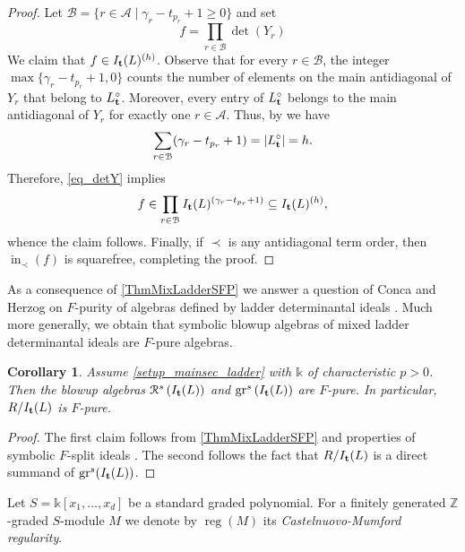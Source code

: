 \documentclass[12pt]{amsart}
\renewcommand{\geq}{\geqslant}
\newtheorem{corollary}[corollary]{Corollary}
\theoremstyle{definition}
\newcommand{\R}[1]{R^{1/p^{#1}}}
\renewcommand{\(}{\left(}
\renewcommand{\)}{\right)}
\newcommand{\ZZ}{\mathbb{Z}}
\newcommand{\kk}{\mathbb{k}}
\newcommand{\IN}{\operatorname{in}}
\newcommand{\reg}{\operatorname{reg}}
\newcommand{\gr}{\operatorname{gr}}
\def \R{\mathcal R}
\renewcommand{\!}[1]{{\color{red}\text{\Huge$\star$ }#1}}
\newcommand{\ttt}{{\bf t}}
\begin{document}
\begin{proof}
Let $\mathcal{B}=\{r \in \mathcal{A}\mid \gamma_r-t_{p_r}+1 \geq 0\}$ and set 
\begin{equation}\label{eq_f}
f=\prod_{r \in \mathcal{B}} \det(Y_r)
\end{equation}
 We claim that $f \in I_{\ttt}(L)^{(h)}$. Observe that for every $r \in \mathcal{B}$, the integer $\max\{\gamma_r-t_{p_r}+1,0\}$ counts  the number of elements on the main antidiagonal of $Y_r$ that belong to $L^\circ_\ttt$. 
Moreover, %
every entry of $L^\circ_\ttt$  belongs to the main antidiagonal of  $Y_r$ for exactly one $r \in \mathcal{A}$. Thus, by  \cite[Theorem 1.15]{GorlaMixed} we  have 
\begin{equation}\label{eq_sum_height}
	\sum_{r \in \mathcal{B}}(\gamma_r-t_{p_r} + 1) = |L^\circ_\ttt| = h.
\end{equation}
 Therefore, \autoref{eq_detY} implies
\[
f \in \prod_{r \in \mathcal{B}} I_{\ttt}(L)^{\left(\gamma_r-t_{p_r}+1\right)} \subseteq I_{\ttt}(L)^{(h)},
\]
whence the claim follows. Finally, if $\prec$ is any antidiagonal term order, then $\IN_\prec(f)$ is squarefree, completing the proof.
\end{proof}

As a consequence of \autoref{ThmMixLadderSFP} we answer a question of Conca and Herzog on $F$-purity of algebras defined by ladder determinantal ideals \cite[p. 122]{concaherzog1997}. Much more generally, we obtain that symbolic blowup algebras of mixed ladder determinantal ideals are $F$-pure algebras. 

\begin{corollary}\label{blowups_f_pure}
Assume \autoref{setup_mainsec_ladder} with   $\mathbb{k}$ of  characteristic $p>0$.
Then the blowup algebras $\R^s\left(I_{\ttt}(L)\right)$ and $\gr^s\left(I_{\ttt}(L)\right)$ are $F$-pure. In particular, $R/I_\ttt(L)$ is $F$-pure.
\end{corollary}
\begin{proof}
The first claim follows from  \autoref{ThmMixLadderSFP} and properties of symbolic $F$-split ideals \cite[Theorem 4.7]{DSMNB}. The second follows the fact that $R/I_\ttt(L)$ is a direct summand of $\gr^s(I_\ttt(L))$.
\end{proof}

Let $S=\kk[x_1,\ldots, x_d]$ be a standard graded polynomial. For a finitely generated $\ZZ$-graded $S$-module $M$ we  denote by $\reg(M)$ its   {\it Castelnuovo-Mumford regularity}.
\end{document}
